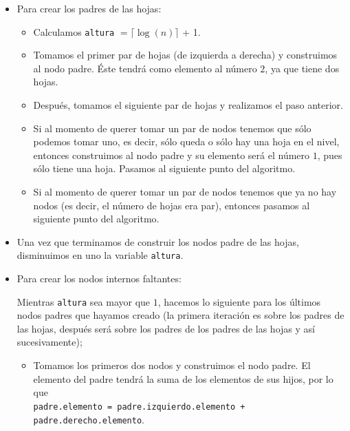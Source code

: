 \documentclass[letterpaper,11pt]{article}
\begin{document}
\begin{enumerate}
\begin{itemize}
\begin{itemize}
            \item Para crear los padres de las hojas:
            \begin{itemize}
                \item Calculamos \texttt{altura} $= \lceil \log(n)\rceil$ + 1. 
    
                \item Tomamos el primer par de hojas (de izquierda a derecha) y 
                construimos al nodo padre. Éste tendrá como elemento al número 
                $2$, ya que tiene dos hojas.
    
                \item Después, tomamos el siguiente par de hojas y realizamos el 
                paso anterior. 
                
                \item Si al momento de querer tomar un par de nodos tenemos que 
                sólo podemos tomar uno, es decir, sólo queda o sólo hay una hoja 
                en el nivel, entonces construimos al nodo padre y su elemento 
                será el número $1$, pues sólo tiene una hoja. Pasamos al
                siguiente punto del algoritmo.

                \item Si al momento de querer tomar un par de nodos tenemos que 
                ya no hay nodos (es decir, el número de hojas era par), entonces 
                pasamos al siguiente punto del algoritmo.
            \end{itemize}

            \item Una vez que terminamos de construir los nodos padre de las
            hojas, disminuimos en uno la variable \texttt{altura}.

            \item Para crear los nodos internos faltantes:

            Mientras \texttt{altura} sea mayor que $1$, hacemos lo siguiente 
            para los últimos nodos padres que hayamos creado (la primera 
            iteración es sobre los padres de las hojas, después será sobre 
            los padres de los padres de las hojas y así sucesivamente); 
            \begin{itemize}
                \item Tomamos los primeros dos nodos y construimos el nodo 
                padre. El elemento del padre tendrá la suma de los elementos 
                de sus hijos, por lo que \\ 
                \texttt{padre.elemento = padre.izquierdo.elemento + 
                padre.derecho.elemento}.
    

\end{itemize}
\end{itemize}
\end{itemize}
\end{enumerate}
\end{document}
